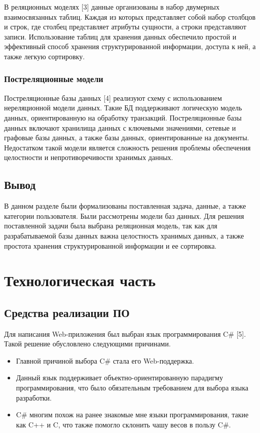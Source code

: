 \documentclass[a4paper,14pt, unknownkeysallowed]{extreport}
\begin{document}
В реляционных моделях [3] данные организованы в набор двумерных взаимосвязанных таблиц. Каждая из которых представляет собой набор столбцов и строк, где столбец представляет атрибуты сущности, а строки представляют записи.
Использование таблиц для хранения данных обеспечило простой и эффективный способ хранения структурированной информации, доступа к ней, а также легкую сортировку.

\subsection{Постреляционные модели}

Постреляционные базы данных [4] реализуют схему с использованием нереляционной модели данных. Такие БД поддерживают логическую модель данных, ориентированную на обработку транзакций. 
Постреляционные базы данных включают хранилища данных с ключевыми значениями, сетевые и графовые базы данных, а также базы данных, ориентированные на документы. 
Недостатком такой модели является сложность решения проблемы обеспечения целостности и непротиворечивости хранимых данных.

\section{Вывод}

В данном разделе были формализованы поставленная задача, данные, а также категории пользователя. Были рассмотрены модели баз данных. Для решения поставленной задачи была выбрана реляционная модель, так как для разрабатываемой базы данных важна целостность хранимых данных, а также простота хранения структурированной информации и ее сортировка.



\chapter{Технологическая часть}

\section{Средства реализации ПО}

Для написания Web-приложения был выбран язык программирования C\# [5]. Такой решение обусловлено следующими причинами.

\begin{itemize}
    \item Главной причиной выбора C\# стала его Web-поддержка.
    \item Данный язык поддерживает объектно-ориентированную парадигму программирования, что было обязательным требованием для выбора языка разработки.
    \item C\# многим похож на ранее знакомые мне языки программирования, такие как C++ и C, что также помогло склонить чашу весов в пользу C\#. 
\end{itemize}
\end{document}
